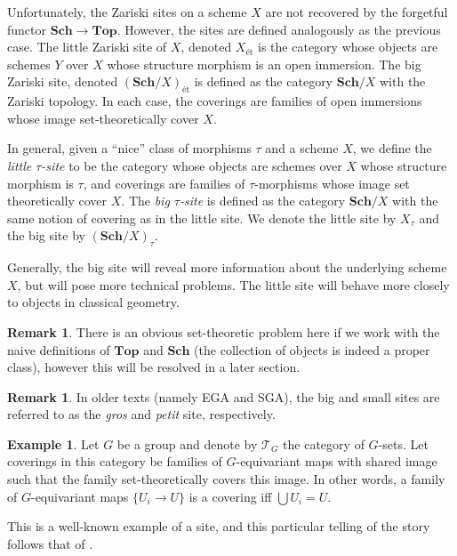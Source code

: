 \documentclass{amsart}
\newcommand{\Top}{\mathbf{Top}}
\newcommand{\Sch}{\mathbf{Sch}}
\theoremstyle{definition}
\newtheorem{example}[theorem]{Example}
\newtheorem{remark}[theorem]{Remark}
\theoremstyle{remark}
\begin{document}
Unfortunately, the Zariski sites on a scheme $X$ are not recovered by the
forgetful functor $\Sch \to \Top$. However, the sites are defined analogously
as the previous case. The little Zariski site of $X$, denoted $X_{\text{\'et}}$
is the category whose objects are schemes $Y$ over $X$ whose structure morphism
is an open immersion. The big Zariski site, denoted $(\Sch/X)_{\text{\'et}}$ is
defined as the category $\Sch/X$ with the Zariski topology.  In each case, the
coverings are families of open immersions whose image set-theoretically cover
$X$.

In general, given a ``nice'' class of morphisms $\tau$ and a scheme $X$, we
define the \textit{little $\tau$-site} to be the category whose objects are
schemes over $X$ whose structure morphism is $\tau$, and coverings are families
of $\tau$-morphisms whose image set theoretically cover $X$. The \textit{big
    $\tau$-site} is defined as the category $\Sch/X$ with the same notion of
covering as in the little site. We denote the little site by $X_\tau$ and the
big site by $(\Sch/X)_\tau$.

Generally, the big site will reveal more information about the underlying scheme
$X$, but will pose more technical problems. The little site will behave more
closely to objects in classical geometry.

\begin{remark}
    There is an obvious set-theoretic problem here if we work with the naive
    definitions of $\Top$ and $\Sch$ (the collection of objects is indeed a
    proper class), however this will be resolved in a later section.
\end{remark}

\begin{remark}
    In older texts (namely EGA and SGA), the big and small sites are referred to
    as the \textit{gros} and \textit{petit} site, respectively.
\end{remark}

\begin{example}
    Let $G$ be a group and denote by $\mathcal{T}_G$ the category of $G$-sets.
    Let coverings in this category be families of $G$-equivariant maps with
    shared image such that the family set-theoretically covers this image. In
    other words, a family of $G$-equivariant maps $\{U_i \to U\}$ is a covering
    iff $\bigcup U_i = U$.
    
    This is a well-known example of a site, and this particular telling of the
    story follows that of
    \cite[\href{https://stacks.math.columbia.edu/tag/03NP}{Tag
        03NP}]{stacks-project}.
\end{example}
\end{document}
